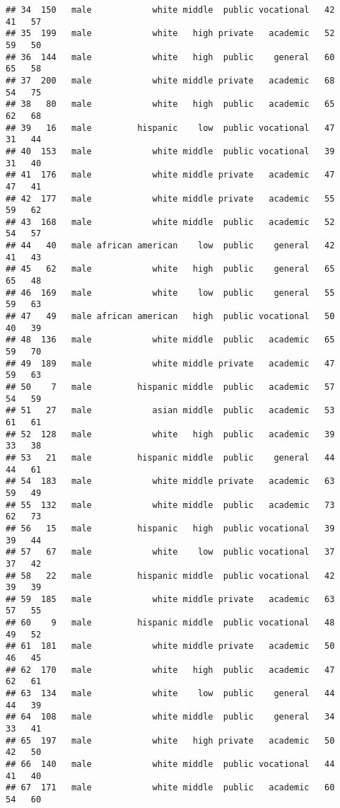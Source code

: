 \documentclass[
]{article}
\begin{document}
\begin{verbatim}
## 34  150   male            white middle  public vocational   42    41   57
## 35  199   male            white   high private   academic   52    59   50
## 36  144   male            white   high  public    general   60    65   58
## 37  200   male            white middle private   academic   68    54   75
## 38   80   male            white   high  public   academic   65    62   68
## 39   16   male         hispanic    low  public vocational   47    31   44
## 40  153   male            white middle  public vocational   39    31   40
## 41  176   male            white middle private   academic   47    47   41
## 42  177   male            white middle private   academic   55    59   62
## 43  168   male            white middle  public   academic   52    54   57
## 44   40   male african american    low  public    general   42    41   43
## 45   62   male            white   high  public    general   65    65   48
## 46  169   male            white    low  public    general   55    59   63
## 47   49   male african american   high  public vocational   50    40   39
## 48  136   male            white middle  public   academic   65    59   70
## 49  189   male            white middle private   academic   47    59   63
## 50    7   male         hispanic middle  public   academic   57    54   59
## 51   27   male            asian middle  public   academic   53    61   61
## 52  128   male            white   high  public   academic   39    33   38
## 53   21   male         hispanic middle  public    general   44    44   61
## 54  183   male            white middle private   academic   63    59   49
## 55  132   male            white middle  public   academic   73    62   73
## 56   15   male         hispanic   high  public vocational   39    39   44
## 57   67   male            white    low  public vocational   37    37   42
## 58   22   male         hispanic middle  public vocational   42    39   39
## 59  185   male            white middle private   academic   63    57   55
## 60    9   male         hispanic middle  public vocational   48    49   52
## 61  181   male            white middle private   academic   50    46   45
## 62  170   male            white   high  public   academic   47    62   61
## 63  134   male            white    low  public    general   44    44   39
## 64  108   male            white middle  public    general   34    33   41
## 65  197   male            white   high private   academic   50    42   50
## 66  140   male            white middle  public vocational   44    41   40
## 67  171   male            white middle  public   academic   60    54   60

\end{verbatim}
\end{document}
